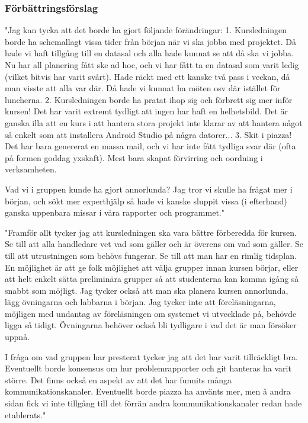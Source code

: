 \documentclass[a4paper]{article}
\begin{document}
\subsubsection{Förbättringsförslag}
"Jag kan tycka att det borde ha gjort följande förändringar:
1. Kursledningen borde ha schemallagt vissa tider från början när vi ska jobba med projektet. Då hade vi haft tillgång till en datasal och alla hade kunnat se att då ska vi jobba. Nu har all planering fått ske ad hoc, och vi har fått ta en datasal som varit ledig (vilket bitvis har varit svårt).
Hade räckt med ett kanske två pass i veckan, då man visste att alla var där. Då hade vi kunnat ha möten osv där istället för luncherna.
2. Kursledningen borde ha pratat ihop sig och förbrett sig mer inför kursen! Det har varit extremt tydligt att ingen har haft en helhetsbild. Det är ganska illa att en kurs i att hantera stora projekt inte klarar av att hantera något så enkelt som att installera Android Studio på några datorer...
3. Skit i piazza! Det har bara genererat en massa mail, och vi har inte fått tydliga svar där (ofta på formen goddag yxskaft). Mest bara skapat förvirring och oordning i verksamheten.

Vad vi i gruppen kunde ha gjort annorlunda?
Jag tror vi skulle ha frågat mer i början, och sökt mer experthjälp så hade vi kanske sluppit vissa (i efterhand) ganska uppenbara missar i våra rapporter och programmet."

"Framför allt tycker jag att kursledningen ska vara bättre förberedda för kursen. Se till att alla handledare vet vad som gäller och är överens om vad som gäller. Se till att utrustningen som behövs fungerar. Se till att man har en rimlig tidsplan. En möjlighet är att ge folk möjlighet att välja grupper innan kursen börjar, eller att helt enkelt sätta preliminära grupper så att studenterna kan komma igång så snabbt som möjligt. Jag tycker också att man ska planera kursen annorlunda, lägg övningarna och labbarna i början. Jag tycker inte att föreläsningarna, möjligen med undantag av föreläsningen om systemet vi utvecklade på, behövde ligga så tidigt. Övningarna behöver också bli tydligare i vad det är man försöker uppnå.

I fråga om vad gruppen har presterat tycker jag att det har varit tillräckligt bra. Eventuellt borde konsensus om hur problemrapporter och git hanteras ha varit större. Det finns också en aspekt av att det har funnits många kommunikationskanaler. Eventuellt borde piazza ha använts mer, men å andra sidan fick vi inte tillgång till det förrän andra kommunikationskanaler redan hade etablerats."
\end{document}
